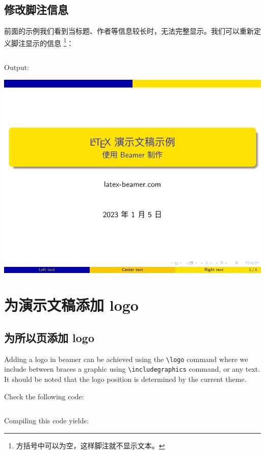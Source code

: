 \subsection{修改脚注信息}

前面的示例我们看到当标题、作者等信息较长时，无法完整显示。我们可以重新定义脚注显示的信息
\footnote{方括号中可以为空，这样脚注就不显示文本。}：

\inputminted[linenos=true]{latex}{examples/beamer/beamertitle05.tex}

Output:

\includegraphics{examples/beamer/beamertitle05.pdf}

\section{为演示文稿添加 logo}

\subsection{为所以页添加 logo}

Adding a logo in beamer can be achieved using the \verb|\logo| command where we include between braces a graphic using \verb|\includegraphics| command, or any text. It should be noted that the logo position is determined by the current theme.

Check the following code:

\inputminted[linenos=true]{latex}{examples/beamer/beamerlogo01.tex}

Compiling this code yields:

